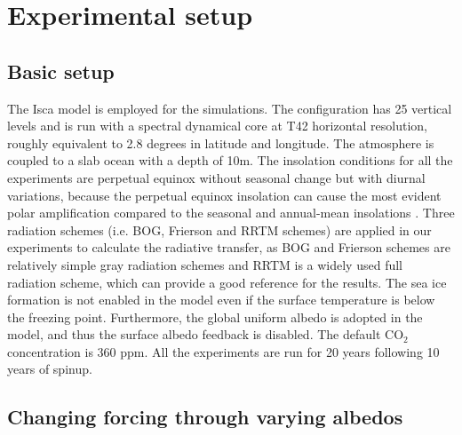 
\section{Experimental setup}
\label{sec:polar_amiplicaiton_setup}

\subsection{Basic setup}

The Isca model is employed for the simulations. The configuration has 25 vertical levels and is run with a spectral dynamical core at T42 horizontal resolution, roughly equivalent to 2.8 degrees in latitude and longitude. The atmosphere is coupled to a slab ocean with a depth of 10m. The insolation conditions for all the experiments are perpetual equinox without seasonal change but with diurnal variations, because the perpetual equinox insolation can cause the most evident polar amplification compared to the seasonal and annual-mean insolations \citep{Kim2018}. Three radiation schemes (i.e. BOG, Frierson and RRTM schemes) are applied in our experiments to calculate the radiative transfer, as BOG and Frierson schemes are relatively simple gray radiation schemes and RRTM is a widely used full radiation scheme, which can provide a good reference for the results. The sea ice formation is not enabled in the model even if the surface temperature is below the freezing point. Furthermore, the global uniform albedo is adopted in the model, and thus the surface albedo feedback is disabled. The default CO$_2$ concentration is 360 ppm. All the experiments are run for 20 years following 10 years of spinup.


\subsection{Changing forcing through varying albedos}

